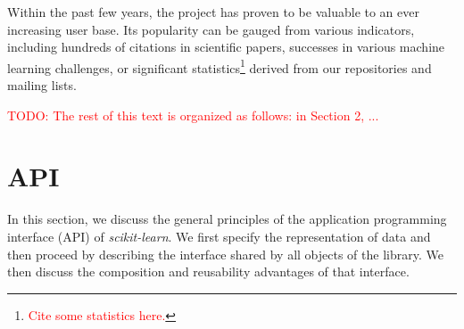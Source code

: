 \documentclass{llncs}
\begin{document}
Within the past few years, the project has proven to be valuable to an  ever
increasing user base. Its popularity can be gauged from various indicators,
including hundreds of citations in scientific papers, successes in various
machine learning challenges, or significant statistics\footnote{\textcolor{red}{Cite some
statistics here.}} derived from our repositories and mailing lists.

\textcolor{red}{TODO: The rest of this text is organized as follows: in Section 2, ...}





\section{API}

In this section, we discuss the general principles of the application
programming interface (API) of \textit{scikit-learn}. We first specify the
representation of data and then proceed by describing the interface shared by
all objects of the library. We then discuss the composition and reusability
advantages of that interface.
\end{document}
